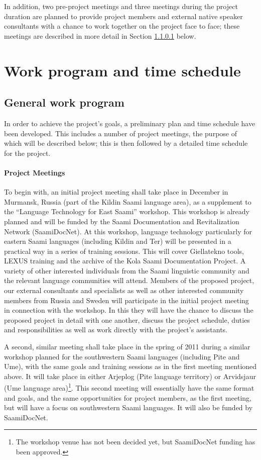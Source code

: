\documentclass[a4paper,12pt]{article}
\begin{document}
{{In addition, two pre-project meetings and three meetings during the project duration are planned to provide project members and external native speaker consultants with a chance to work together on the project face to face; these meetings are described in more detail in Section \ref{meetings} below.

\section{Work program and time schedule}
\subsection{General work program}

In order to achieve the project's goals, a preliminary plan and time schedule have been developed. This includes a number of project meetings, the purpose of which will be described below; this is then followed by a detailed time schedule for the project.

\paragraph{Project Meetings}\label{meetings}
To begin with, an initial project meeting shall take place in December in Murmansk, Russia (part of the Kildin Saami language area), as a supplement to the “Language Technology for East Saami” workshop. This workshop is already planned and will be funded by the Saami Documentation and Revitalization Network (SaamiDocNet). At this workshop, language technology particularly for eastern Saami languages (including Kildin and Ter) will be presented in a practical way in a series of training sessions. This will cover Giellatekno tools, LEXUS training and the archive of the Kola Saami Documentation Project. A variety of other interested individuals from the Saami linguistic community and the relevant language communities will attend. Members of the proposed project, our external consultants and specialists as well as other interested community members from Russia and Sweden will participate in the initial project meeting in connection with the workshop. In this they will have the chance to discuss the proposed project in detail with one another, discuss the project schedule, duties and responsibilities as well as work directly with the project's assistants.

A second, similar meeting shall take place in the spring of 2011 during a similar workshop planned for the southwestern Saami languages (including Pite and Ume), with the same goals and training sessions as in the first meeting mentioned above. It will take place in either Arjeplog (Pite language territory) or Arvidsjaur (Ume language area)\footnote{The workshop venue has not been decided yet, but SaamiDocNet funding has been approved.}. This second meeting will essentially have the same format and goals, and the same opportunities for project members, as the first meeting, but will have a focus on southwestern Saami languages. It will also be funded by SaamiDocNet.

}}
\end{document}
